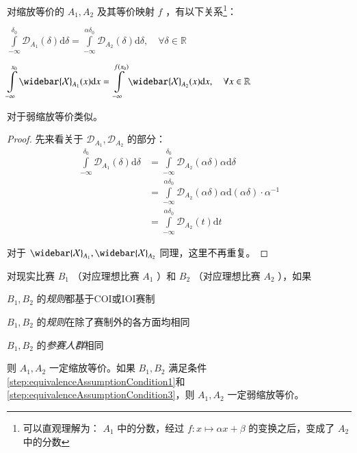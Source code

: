         \begin{proposition}[缩放等价的实际含义]
            对缩放等价的 $A_1,A_2$ 及其等价映射 $f$ ，有以下关系\footnote{可以直观理解为： $A_1$ 中的分数，经过 $f:x\mapsto\alpha x+\beta$ 的变换之后，变成了 $A_2$ 中的分数}：
            \begin{asparaenum}
                \item $\displaystyle\int\limits_{-\infty}^{\delta_0} \mathcal{D}_{A_1}(\delta)\mathrm{d}\delta=\displaystyle\int\limits_{-\infty}^{\alpha\delta_0} \mathcal{D}_{A_2}(\delta)\mathrm{d}\delta,\quad\forall\delta\in\mathbb{R}$
                \item $\displaystyle\int\limits_{-\infty}^{x_0} \widebar{\mathcal{X}}_{A_1}(x)\mathrm{d}x=\displaystyle\int\limits_{-\infty}^{f(x_0)} \widebar{\mathcal{X}}_{A_2}(x)\mathrm{d}x,\quad\forall x\in\mathbb{R}$
            \end{asparaenum}

            对于弱缩放等价类似。

            \label{prop:equivalenceAfterScalingMeaning}
        \end{proposition}

        \begin{proof}
            先来看关于 $\mathcal{D}_{A_1},\mathcal{D}_{A_2}$ 的部分：
            \begin{align*}
                \int\limits_{-\infty}^{\delta_0} \mathcal{D}_{A_1}(\delta)\mathrm{d}\delta 
                &=\int\limits_{-\infty}^{\delta_0} \mathcal{D}_{A_2}(\alpha\delta)\alpha\mathrm{d}\delta \\
                &=\int\limits_{-\infty}^{\alpha\delta_0} \mathcal{D}_{A_2}(\alpha\delta)\alpha \mathrm{d}(\alpha\delta)\cdot\alpha^{-1} \\
                &=\int\limits_{-\infty}^{\alpha\delta_0}\mathcal{D}_{A_2}(t)\mathrm{d}t
            \end{align*}

            对于 $\widebar{\mathcal{X}}_{A_1},\widebar{\mathcal{X}}_{A_2}$ 同理，这里不再重复。
        \end{proof}

        \begin{assumption}
            对现实比赛 $B_1$ （对应理想比赛 $A_1$ ）和 $B_2$ （对应理想比赛 $A_2$ ），如果
            \begin{asparaenum}
                \item \label{step:equivalenceAssumptionCondition1} $B_1,B_2$ 的\emph{规则}都基于COI或IOI赛制
                \item \label{step:equivalenceAssumptionCondition2} $B_1,B_2$ 的\emph{规则}在除了赛制外的各方面均相同
                \item \label{step:equivalenceAssumptionCondition3} $B_1,B_2$ 的\emph{参赛人群}相同
            \end{asparaenum}

            则 $A_1,A_2$ 一定缩放等价。如果 $B_1,B_2$ 满足条件\ref{step:equivalenceAssumptionCondition1}和\ref{step:equivalenceAssumptionCondition3}，则 $A_1,A_2$ 一定弱缩放等价。

            \label{ass:equivalenceBetweenCodingContests}
        \end{assumption}

